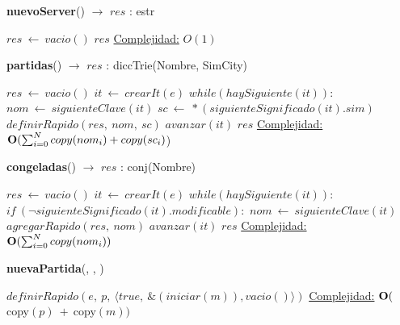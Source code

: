 \begin{Algoritmos}

    \begin{algorithm}[H]{\textbf{nuevoServer}() $\to$ $res$ : estr}
        \begin{algorithmic}[1]
            \State $res\ \gets\ vacio()$
            \State \Return $res$
            \medskip
            \Statex \underline{Complejidad:} $O(1)$
        \end{algorithmic}
    \end{algorithm}

    \begin{algorithm}[H]{\textbf{partidas}() $\to$ $res$ : diccTrie(Nombre, SimCity)}
        \begin{algorithmic}[1]
            \State $res\ \gets\ vacio()$
            \State $it\ \gets\ crearIt(e)$
            \State $while(haySiguiente(it)):$
            \State \indent $nom\ \gets\ siguienteClave(it)$
            \State \indent $sc\ \gets\ *(siguienteSignificado(it).sim)$
            \State \indent $definirRapido(res,\ nom,\ sc)$
            \State \indent $avanzar(it)$ 
            \State \Return $res$
            \medskip
            \Statex \underline{Complejidad:} $\bold{O}(\sum_{i = 0}^{N}{copy(nom_i) + copy(sc_i)}$)
        \end{algorithmic}
    \end{algorithm}

    \begin{algorithm}[H]{\textbf{congeladas}() $\to$ $res$ : conj(Nombre)}
        \begin{algorithmic}[1]
            \State $res\ \gets\ vacio()$
            \State $it\ \gets\ crearIt(e)$
            \State $while(haySiguiente(it)):$
            \State \indent $if\ (\neg siguienteSignificado(it).modificable):$
            \State \indent \indent $nom\ \gets\ siguienteClave(it)$
            \State \indent \indent $agregarRapido(res,\ nom)$
            \State \indent $avanzar(it)$ 
            \State \Return $res$
            \medskip
            \Statex \underline{Complejidad:} $\bold{O}(\sum_{i = 0}^{N}{copy(nom_i)})$
        \end{algorithmic}
    \end{algorithm}

    \begin{algorithm}[H]{\textbf{nuevaPartida}(, , )}
        \begin{algorithmic}[1]
            \State $definirRapido(e,\ p,\ \langle true,\ \&(iniciar(m)), vacio() \rangle )$ 
            \medskip
            \Statex \underline{Complejidad:} $\bold{O}($copy$(p)\ +\ $copy$(m))$
        \end{algorithmic}
    \end{algorithm}


\end{Algoritmos}
